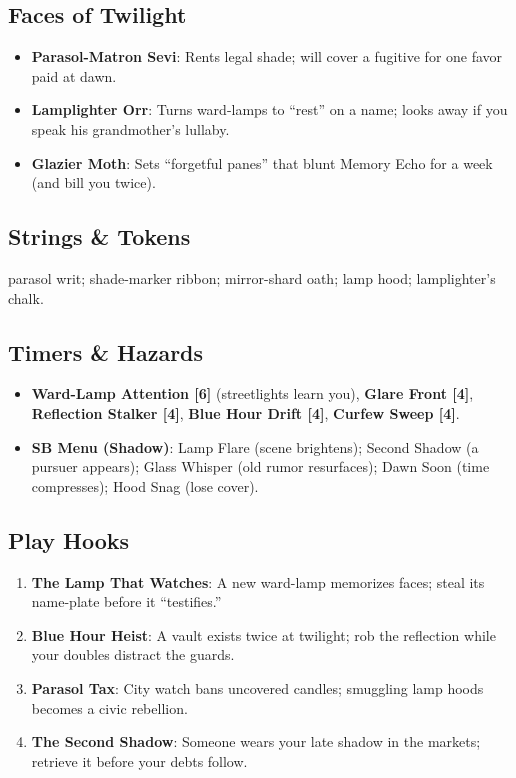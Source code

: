 \documentclass[11pt,letterpaper]{article}
\begin{document}
\subsection*{Faces of Twilight}
\begin{itemize}
\item \textbf{Parasol-Matron Sevi}: Rents legal shade; will cover a fugitive for one favor paid at dawn.
\item \textbf{Lamplighter Orr}: Turns ward-lamps to ``rest'' on a name; looks away if you speak his grandmother's lullaby.
\item \textbf{Glazier Moth}: Sets ``forgetful panes'' that blunt Memory Echo for a week (and bill you twice).
\end{itemize}

\subsection*{Strings \& Tokens}
parasol writ; shade-marker ribbon; mirror-shard oath; lamp hood; lamplighter's chalk.

\subsection*{Timers \& Hazards}
\begin{itemize}
\item \textbf{Ward-Lamp Attention [6]} (streetlights learn you), \textbf{Glare Front [4]}, \textbf{Reflection Stalker [4]}, \textbf{Blue Hour Drift [4]}, \textbf{Curfew Sweep [4]}.
\item \textbf{SB Menu (Shadow)}: Lamp Flare (scene brightens); Second Shadow (a pursuer appears); Glass Whisper (old rumor resurfaces); Dawn Soon (time compresses); Hood Snag (lose cover).
\end{itemize}

\subsection*{Play Hooks}
\begin{enumerate}
\item \textbf{The Lamp That Watches}: A new ward-lamp memorizes faces; steal its name-plate before it ``testifies.''
\item \textbf{Blue Hour Heist}: A vault exists twice at twilight; rob the reflection while your doubles distract the guards.
\item \textbf{Parasol Tax}: City watch bans uncovered candles; smuggling lamp hoods becomes a civic rebellion.
\item \textbf{The Second Shadow}: Someone wears your late shadow in the markets; retrieve it before your debts follow.
\end{enumerate}
\end{document}

